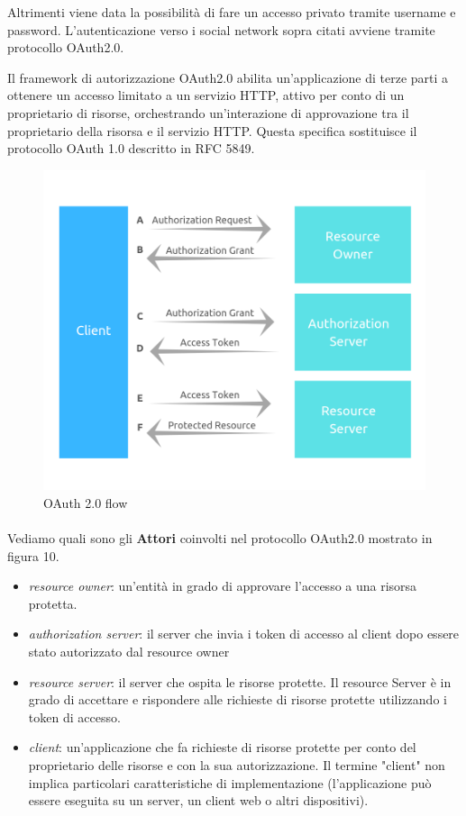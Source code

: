Altrimenti viene data la possibilità di fare un accesso privato tramite username e password.
L'autenticazione verso i social network sopra citati avviene tramite protocollo OAuth2.0.

Il framework di autorizzazione OAuth2.0 abilita un'applicazione di terze parti a ottenere un accesso limitato a un servizio HTTP, attivo
per conto di un proprietario di risorse, orchestrando un'interazione di approvazione tra il proprietario della risorsa e il servizio HTTP.
Questa specifica sostituisce il protocollo OAuth 1.0 descritto in RFC 5849.

\begin{figure}[h!]
    \centering  
    \caption{OAuth 2.0 flow }
    \includegraphics[scale=0.60]{img/cap2/oauth20-2}
\end{figure}

\paragraph{}

Vediamo quali sono gli \textbf{Attori} coinvolti nel protocollo OAuth2.0 mostrato in figura 10.

\begin{itemize}
\item \textit{resource owner}: un'entità in grado di approvare l'accesso a una risorsa protetta.
\item \textit{authorization server}: il server che invia i token di accesso al client dopo essere stato autorizzato
dal resource owner
\item \textit{resource server}: il server che ospita le risorse protette. Il resource Server è in grado di accettare
e rispondere alle richieste di risorse protette utilizzando i token di accesso.
\item \textit{client}: un'applicazione che fa richieste di risorse protette per conto del
proprietario delle risorse e con la sua autorizzazione. Il termine "client"
non implica particolari caratteristiche di implementazione (l'applicazione può essere eseguita
su un server, un client web o altri dispositivi).
\end{itemize}


